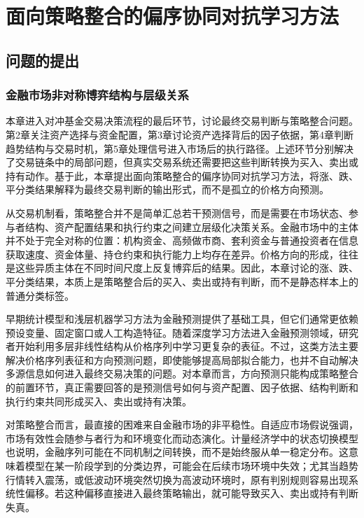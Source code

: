 \chapter{面向策略整合的偏序协同对抗学习方法}

\section{问题的提出}


\subsection{金融市场非对称博弈结构与层级关系}

本章进入对冲基金交易决策流程的最后环节，讨论最终交易判断与策略整合问题。第2章关注资产选择与资金配置，第3章讨论资产选择背后的因子依据，第4章判断趋势结构与交易时机，第5章处理信号进入市场后的执行路径。上述环节分别解决了交易链条中的局部问题，但真实交易系统还需要把这些判断转换为买入、卖出或持有动作。基于此，本章提出面向策略整合的偏序协同对抗学习方法，将涨、跌、平分类结果解释为最终交易判断的输出形式，而不是孤立的价格方向预测。

从交易机制看，策略整合并不是简单汇总若干预测信号，而是需要在市场状态、参与者结构、资产配置结果和执行约束之间建立层级化决策关系。金融市场中的主体并不处于完全对称的位置：机构资金、高频做市商、套利资金与普通投资者在信息获取速度、资金体量、持仓约束和执行能力上均存在差异。价格方向的形成，往往是这些异质主体在不同时间尺度上反复博弈后的结果。因此，本章讨论的涨、跌、平分类结果，本质上是策略整合后的买入、卖出或持有判断，而不是静态样本上的普通分类标签。

早期统计模型和浅层机器学习方法为金融预测提供了基础工具，但它们通常更依赖预设变量、固定窗口或人工构造特征。随着深度学习方法进入金融预测领域，研究者开始利用多层非线性结构从价格序列中学习更复杂的表征。不过，这类方法主要解决价格序列表征和方向预测问题，即使能够提高局部拟合能力，也并不自动解决多源信息如何进入最终交易决策的问题。对本章而言，方向预测只能构成策略整合的前置环节，真正需要回答的是预测信号如何与资产配置、因子依据、结构判断和执行约束共同形成买入、卖出或持有决策。

对策略整合而言，最直接的困难来自金融市场的非平稳性。自适应市场假说强调，市场有效性会随参与者行为和环境变化而动态演化\cite{lo2004adaptive}。计量经济学中的状态切换模型也说明，金融序列可能在不同机制之间转换，而不是始终服从单一稳定分布\cite{hamilton1989regime}。这意味着模型在某一阶段学到的分类边界，可能会在后续市场环境中失效；尤其当趋势行情转入震荡，或低波动环境突然切换为高波动环境时，原有判别规则容易出现系统性偏移。若这种偏移直接进入最终策略输出，就可能导致买入、卖出或持有判断失真。

